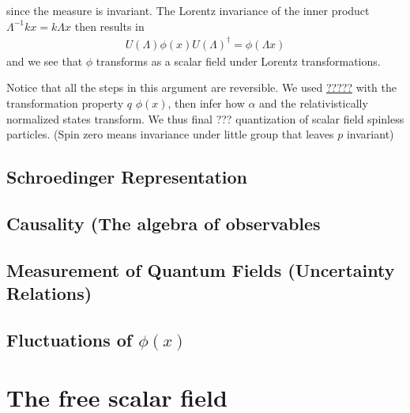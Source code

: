 \documentclass{article}
\begin{document}
since the measure is invariant. The Lorentz invariance of the inner product $\Lambda^{-1}k x=k\Lambda x$ then results in
\begin{align}
U(\Lambda)\phi(x)U(\Lambda)^\dagger=\phi(\Lambda x)
\end{align}
and we see that $\phi$ transforms as a scalar field under Lorentz transformations.

Notice that all the steps in this argument are reversible. We used \underline{?????} with the transformation property $q$ $\phi(x)$, then infer how $\alpha$ and the relativistically normalized states transform. We thus final ??? quantization of scalar field spinless particles. (Spin zero means invariance under little group that leaves $p$ invariant)

\subsection{Schroedinger Representation}
\subsection{Causality (The algebra of observables}

\subsection{Measurement of Quantum Fields (Uncertainty Relations)}

\subsection{Fluctuations of $\phi(x)$}

\section{The free scalar field}
\end{document}

